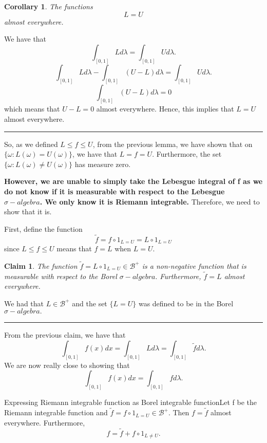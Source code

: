 \documentclass[twoside]{article}
\newtheorem{claim}[theorem]{Claim}
\newtheorem{corollary}[theorem]{Corollary}
\newenvironment{proof}{{\bf Proof:}}{\hfill\rule{2mm}{2mm}}
\newcommand{\borelsigmaalgebra}{\mathcal{B}}
\newcommand{\sa}{\sigma-algebra}
\begin{document}
\begin{corollary}The functions 
$$
L = U
$$
almost everywhere.
\end{corollary}

\begin{proof} We have that
$$
\int_{[0,1]}Ld\lambda = \int_{[0,1]}Ud\lambda.
$$
$$
\int_{[0,1]}Ld\lambda - \int_{[0,1]}(U - L)d\lambda = \int_{[0,1]}Ud\lambda.
$$
$$
\int_{[0,1]}(U - L)d\lambda  = 0
$$
which means that $U - L = 0$ almost everywhere. Hence, this implies that $L = U$ almost everywhere.
\end{proof}

So, as we defined $L \leq f \leq U$, from the previous lemma, we have shown that on $\{\omega: L(\omega) = U(\omega)\}$, we have that $L = f = U$. Furthermore, the set $\{\omega: L(\omega) \neq U(\omega)\}$ has measure zero.

\textbf{However, we are unable to simply take the Lebesgue integral of f as we do not know if it is measurable with respect to the Lebesgue $\sa$. We only know it is Riemann integrable.} Therefore, we need to show that it is.

First, define the function 
$$
\tilde{f} = f\circ 1_{L = U} = L \circ 1_{L = U}
$$
since $L \leq f \leq U$ means that $f = L$ when $L = U.$ 

\begin{claim}The function $\tilde{f} = L \circ 1_{L = U} \in \borelsigmaalgebra^+$ is a non-negative function that is measurable with respect to the Borel $\sa.$ Furthermore, $\tilde{f} = L$ almost everywhere.
\end{claim}

\begin{proof} We had that $L \in \borelsigmaalgebra^+$ and the set $\{L = U\}$ was defined to be in the Borel $\sa.$
\end{proof}

From the previous claim, we have that
$$
\int_{[0,1]}f(x)dx = \int_{[0,1]}Ld\lambda = \int_{[0,1]}\tilde{f}d\lambda.
$$
We are now really close to showing that 
$$
\int_{[0,1]}f(x)dx =  \int_{[0,1]}fd\lambda.
$$

\begin{proposition_exam}{Expressing Riemann integrable function as Borel integrable function}{}Let f be the Riemann integrable function and $\tilde{f} = f\circ 1_{L = U}\in \borelsigmaalgebra^+$. Then 
$
f = \tilde{f}
$
almost everywhere. Furthermore, $$f = \tilde{f} + f\circ 1_{L \neq U}.$$
\end{proposition_exam}
\end{document}
